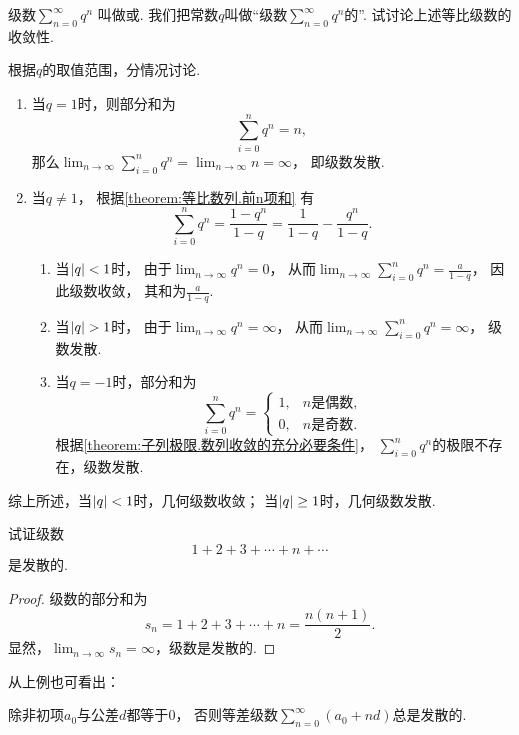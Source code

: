 \begin{example}\label{example:无穷级数.等比级数的收敛性}
级数\(\sum_{n=0}^\infty q^n\)
叫做或.
我们把常数\(q\)叫做“级数\(\sum_{n=0}^\infty q^n\)的”.
试讨论上述等比级数的收敛性.
\begin{solution}
根据\(q\)的取值范围，分情况讨论.
\begin{enumerate}
	\item 当\(q = 1\)时，则部分和为\[
		\sum_{i=0}^n q^n
		= n,
	\]
	那么\(\lim_{n\to\infty} \sum_{i=0}^n q^n
	= \lim_{n\to\infty} n
	= \infty\)，
	即级数发散.

	\item 当\(q \neq 1\)，
	根据\cref{theorem:等比数列.前n项和} 有\[
		\sum_{i=0}^n q^n
		= \frac{1-q^n}{1-q}
		= \frac{1}{1-q} - \frac{q^n}{1-q}.
	\]
	\begin{enumerate}
		\item 当\(\abs{q} < 1\)时，
		由于\(\lim_{n\to\infty} q^n=0\)，
		从而\(\lim_{n\to\infty} \sum_{i=0}^n q^n
		=\frac{a}{1-q}\)，
		因此级数收敛，
		其和为\(\frac{a}{1-q}\).

		\item 当\(\abs{q} > 1\)时，
		由于\(\lim_{n\to\infty} q^n=\infty\)，
		从而\(\lim_{n\to\infty} \sum_{i=0}^n q^n
		=\infty\)，
		级数发散.

		\item 当\(q = -1\)时，部分和为\[
			\sum_{i=0}^n q^n
			= \begin{cases}
				1, & \text{\(n\)是偶数}, \\
				0, & \text{\(n\)是奇数}.
			\end{cases}
		\]
		根据\cref{theorem:子列极限.数列收敛的充分必要条件}，
		\(\sum_{i=0}^n q^n\)的极限不存在，级数发散.
	\end{enumerate}
\end{enumerate}

综上所述，{\color{red}当\(\abs{q} < 1\)时，几何级数收敛；
当\(\abs{q} \geq 1\)时，几何级数发散.}
\end{solution}
\end{example}

\begin{example}\label{example:无穷级数.等差级数的收敛性}
试证级数\[
	1+2+3+\dotsb+n+\dotsb
\]是发散的.
\begin{proof}
级数的部分和为\[
	s_n = 1+2+3+\dotsb+n = \frac{n(n+1)}{2}.
\]
显然，\(\lim_{n\to\infty} s_n=\infty\)，级数是发散的.
\end{proof}
\end{example}
从上例也可看出：
\begin{proposition}
除非初项\(a_0\)与公差\(d\)都等于\(0\)，
否则等差级数\(\sum_{n=0}^\infty(a_0+nd)\)总是发散的.
\end{proposition}

